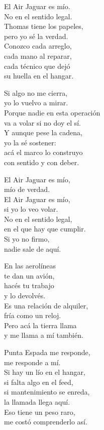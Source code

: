 \begin{lyrics}
El Air Jaguar es mío.\\
No en el sentido legal.\\
Thomas tiene los papeles,\\
pero yo sé la verdad.\\
Conozco cada arreglo,\\
cada mano al reparar,\\
cada técnico que dejó\\
su huella en el hangar.

Si algo no me cierra,\\
yo lo vuelvo a mirar.\\
Porque nadie en esta operación\\
va a volar si no doy el sí.\\
Y aunque pese la cadena,\\
yo la sé sostener:\\
acá el marco lo construyo\\
con sentido y con deber.

El Air Jaguar es mío,\\
mío de verdad.\\
El Air Jaguar es mío,\\
si yo lo veo volar.\\
No en el sentido legal,\\
en el que hay que cumplir.\\
Si yo no firmo,\\
nadie sale de aquí.

En las aerolíneas\\
te dan un avión,\\
hacés tu trabajo\\
y lo devolvés.\\
Es una relación de alquiler,\\
fría como un reloj.\\
Pero acá la tierra llama\\
y me llama a mí también.

Punta Espada me responde,\\
me responde a mí.\\
Si hay un lío en el hangar,\\
si falta algo en el feed,\\
si mantenimiento se enreda,\\
la llamada llega aquí.\\
Eso tiene un peso raro,\\
me costó comprenderlo así.


\end{lyrics}
